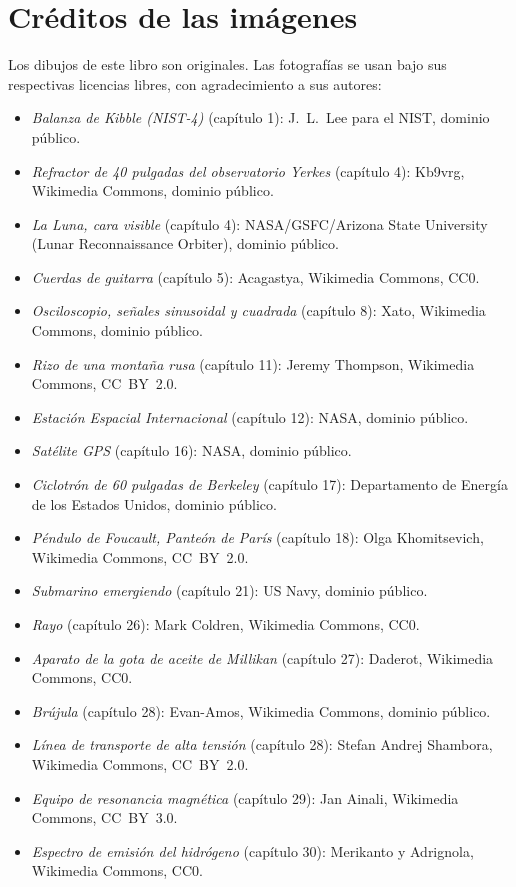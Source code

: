 \chapter*{Créditos de las imágenes}

Los dibujos de este libro son originales. Las fotografías se usan bajo
sus respectivas licencias libres, con agradecimiento a sus autores:

\begin{itemize}
  \item \emph{Balanza de Kibble (NIST-4)} (capítulo 1): J.~L.~Lee
        para el NIST, dominio público.
  \item \emph{Refractor de 40 pulgadas del observatorio Yerkes}
        (capítulo 4): Kb9vrg, Wikimedia Commons, dominio público.
  \item \emph{La Luna, cara visible} (capítulo 4):
        NASA/GSFC/Arizona State University (Lunar Reconnaissance
        Orbiter), dominio público.
  \item \emph{Cuerdas de guitarra} (capítulo 5): Acagastya, Wikimedia
        Commons, CC0.
  \item \emph{Osciloscopio, señales sinusoidal y cuadrada}
        (capítulo 8): Xato, Wikimedia Commons, dominio público.
  \item \emph{Rizo de una montaña rusa} (capítulo 11): Jeremy
        Thompson, Wikimedia Commons, CC~BY~2.0.
  \item \emph{Estación Espacial Internacional} (capítulo 12): NASA,
        dominio público.
  \item \emph{Satélite GPS} (capítulo 16): NASA, dominio público.
  \item \emph{Ciclotrón de 60 pulgadas de Berkeley} (capítulo 17):
        Departamento de Energía de los Estados Unidos, dominio
        público.
  \item \emph{Péndulo de Foucault, Panteón de París} (capítulo 18):
        Olga Khomitsevich, Wikimedia Commons, CC~BY~2.0.
  \item \emph{Submarino emergiendo} (capítulo 21): US Navy, dominio
        público.
  \item \emph{Rayo} (capítulo 26): Mark Coldren, Wikimedia Commons,
        CC0.
  \item \emph{Aparato de la gota de aceite de Millikan}
        (capítulo 27): Daderot, Wikimedia Commons, CC0.
  \item \emph{Brújula} (capítulo 28): Evan-Amos, Wikimedia Commons,
        dominio público.
  \item \emph{Línea de transporte de alta tensión} (capítulo 28):
        Stefan Andrej Shambora, Wikimedia Commons, CC~BY~2.0.
  \item \emph{Equipo de resonancia magnética} (capítulo 29): Jan
        Ainali, Wikimedia Commons, CC~BY~3.0.
  \item \emph{Espectro de emisión del hidrógeno} (capítulo 30):
        Merikanto y Adrignola, Wikimedia Commons, CC0.
\end{itemize}

